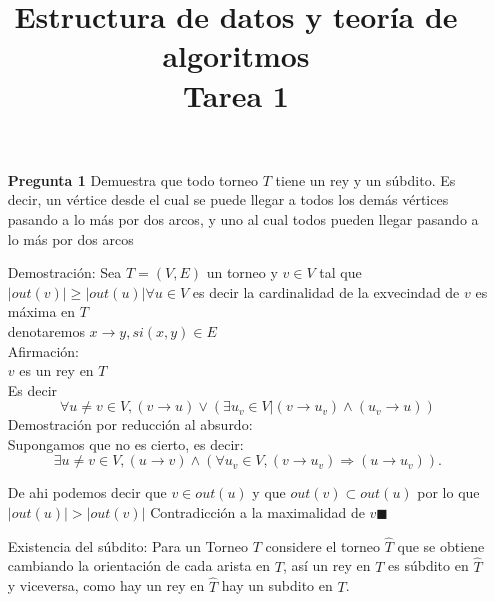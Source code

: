 \documentclass[12pt]{article}
\title{Estructura de datos y teoría de algoritmos\\
Tarea 1 }
\begin{document}
\lstset{language=python}

\begin{itemize}
  \item[\bf{Pregunta 1}] Demuestra que todo torneo $T$ tiene un rey y un súbdito. Es decir, un vértice desde el cual se puede llegar a todos los demás vértices pasando a lo más por dos arcos, y uno al cual todos pueden llegar pasando a lo más por dos arcos

  \item[Demostración:]
    Sea $T=(V,E)$ un torneo y $ v \in V $ tal que $|out(v)| \ge |out(u)| \forall u\in V $ es decir la cardinalidad de la exvecindad de $v$ es máxima en $T$\\
    denotaremos $x \rightarrow  y, si (x,y)\in E$\\
    Afirmación:\\
    $v$ es un rey en $T$\\
    Es decir $$\forall u\ne v \in V ,  (v\rightarrow u) \vee (\exists u_v \in V  |  (v \rightarrow u_v) \wedge (u_v \rightarrow u))$$
    Demostración por reducción al absurdo:\\
    Supongamos que no es cierto, es decir:
    $$\exists u\ne v \in V ,  (u \rightarrow v) \wedge (\forall u_v \in V  ,  (v \rightarrow u_v)  \Rightarrow (u \rightarrow u_v)  ).$$
    
    De ahi podemos decir que $v \in out(u)$ y que $out(v)  \subset out(u)$ por lo que $|out(u)|>|out(v)|$ Contradicción a la maximalidad de $v \blacksquare$

  \item[Existencia del súbdito:]
    Para un Torneo $T$ considere el torneo $\widehat T$ que se obtiene cambiando la orientación de cada arista en $T$, así un rey en $T$ es súbdito en $\widehat T$ y viceversa, como hay un rey en $\widehat T$ hay un subdito en $T$.\\

\end{itemize}
\end{document}
